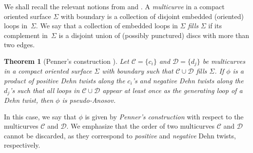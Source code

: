 \documentclass[12pt]{article}
\theoremstyle{theorem}
\newtheorem{theorem}{Theorem}[section]
\theoremstyle{definition}
\theoremstyle{remark}
\numberwithin{equation}{section}
\begin{document}
We shall recall the relevant notions from \cite{Pe88} and \cite[Section~6]{Co09}.
A \emph{multicurve} in a compact oriented surface $\Sigma$ with boundary is a collection of disjoint embedded (oriented) loops in~$\Sigma$.
We say that a collection of embedded loops in $\Sigma$ \emph{fills} $\Sigma$ if its complement in~$\Sigma$ is a disjoint union of (possibly punctured) discs with more than two edges.

\begin{theorem}[Penner's construction {\cite[Theorem~3.1]{Pe88}}]\label{thm: penner_construction}
Let $\mathcal{C}=\{c_i\}$ and $\mathcal{D}=\{d_j\}$ be multicurves in a compact oriented surface $\Sigma$ with boundary such that $\mathcal{C}\cup\mathcal{D}$ fills $\Sigma$.
If $\phi$ is a product of positive Dehn twists along the $c_i$'s and negative Dehn twists along the $d_j$'s such that all loops in $\mathcal{C}\cup\mathcal{D}$ appear at least once as the generating loop of a Dehn twist, then $\phi$ is pseudo-Anosov.
\end{theorem}
In this case, we say that $\phi$ is given by \emph{Penner's construction} with respect to the multicurves $\mathcal{C}$ and $\mathcal{D}$.
We emphasize that the order of two multicurves $\mathcal{C}$ and $\mathcal{D}$ cannot be discarded, as they correspond to \emph{positive} and \emph{negative} Dehn twists, respectively.
\end{document}
